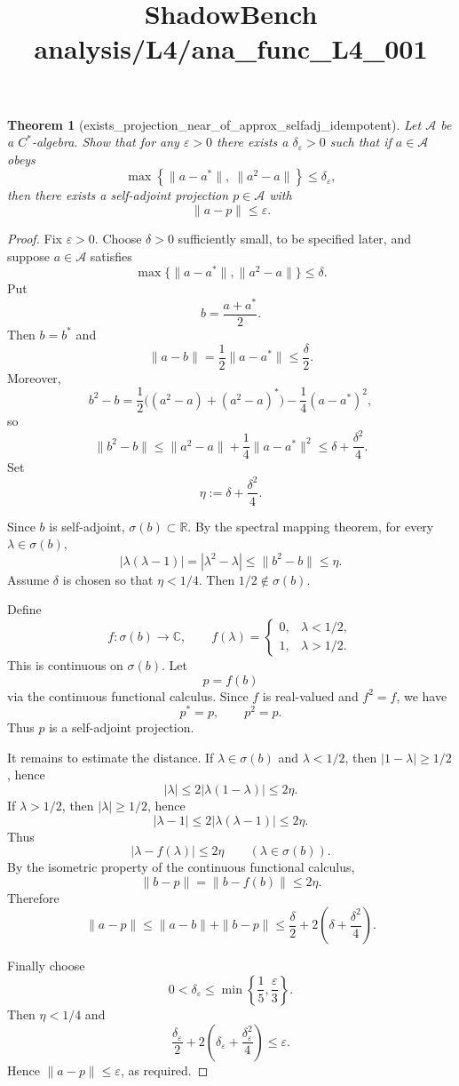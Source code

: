\documentclass{article}
\title{ShadowBench analysis/L4/ana\_func\_L4\_001}
\newtheorem{theorem}{Theorem}
\begin{document}
\maketitle

\begin{theorem}[exists_projection_near_of_approx_selfadj_idempotent]
Let $\mathcal A$ be a $C^*$-algebra. Show that for any $\varepsilon > 0$ there exists a
$\delta_\varepsilon > 0$ such that if $a \in \mathcal A$ obeys
\[
    \max\left\{\|a-a^*\|,\ \|a^2-a\|\right\}\le \delta_\varepsilon,
\]
then there exists a self-adjoint projection $p\in \mathcal A$ with
\[
    \|a-p\|\le \varepsilon.
\]
\end{theorem}

\begin{proof}
Fix $\varepsilon>0$. Choose $\delta>0$ sufficiently small, to be specified later, and suppose
$a\in\mathcal A$ satisfies
\[
    \max\{\|a-a^*\|,\|a^2-a\|\}\le \delta .
\]
Put
\[
    b=\frac{a+a^*}{2}.
\]
Then $b=b^*$ and
\[
    \|a-b\|=\frac12\|a-a^*\|\le \frac{\delta}{2}.
\]
Moreover,
\[
    b^2-b
    =
    \frac12\bigl((a^2-a)+(a^2-a)^*\bigr)
    -\frac14(a-a^*)^2,
\]
so
\[
    \|b^2-b\|
    \le
    \|a^2-a\|+\frac14\|a-a^*\|^2
    \le
    \delta+\frac{\delta^2}{4}.
\]
Set
\[
    \eta:=\delta+\frac{\delta^2}{4}.
\]

Since $b$ is self-adjoint, $\sigma(b)\subset\mathbb R$. By the spectral mapping theorem, for every
$\lambda\in\sigma(b)$,
\[
    |\lambda(\lambda-1)|
    =
    |\lambda^2-\lambda|
    \le
    \|b^2-b\|
    \le \eta .
\]
Assume $\delta$ is chosen so that $\eta<1/4$. Then $1/2\notin\sigma(b)$.

Define
\[
    f:\sigma(b)\to\mathbb C,\qquad
    f(\lambda)=
    \begin{cases}
    0, & \lambda<1/2,\\
    1, & \lambda>1/2.
    \end{cases}
\]
This is continuous on $\sigma(b)$. Let
\[
    p=f(b)
\]
via the continuous functional calculus. Since $f$ is real-valued and $f^2=f$, we have
\[
    p^*=p,\qquad p^2=p.
\]
Thus $p$ is a self-adjoint projection.

It remains to estimate the distance. If $\lambda\in\sigma(b)$ and $\lambda<1/2$, then
$|1-\lambda|\ge 1/2$, hence
\[
    |\lambda|\le 2|\lambda(1-\lambda)|\le 2\eta.
\]
If $\lambda>1/2$, then $|\lambda|\ge 1/2$, hence
\[
    |\lambda-1|\le 2|\lambda(\lambda-1)|\le 2\eta.
\]
Thus
\[
    |\lambda-f(\lambda)|\le 2\eta
    \qquad(\lambda\in\sigma(b)).
\]
By the isometric property of the continuous functional calculus,
\[
    \|b-p\|
    =
    \|b-f(b)\|
    \le 2\eta.
\]
Therefore
\[
    \|a-p\|
    \le
    \|a-b\|+\|b-p\|
    \le
    \frac{\delta}{2}
    +2\left(\delta+\frac{\delta^2}{4}\right).
\]

Finally choose
\[
    0<\delta_\varepsilon\le
    \min\left\{\frac15,\frac{\varepsilon}{3}\right\}.
\]
Then $\eta<1/4$ and
\[
    \frac{\delta_\varepsilon}{2}
    +2\left(\delta_\varepsilon+\frac{\delta_\varepsilon^2}{4}\right)
    \le \varepsilon.
\]
Hence $\|a-p\|\le\varepsilon$, as required.
\end{proof}
\end{document}

